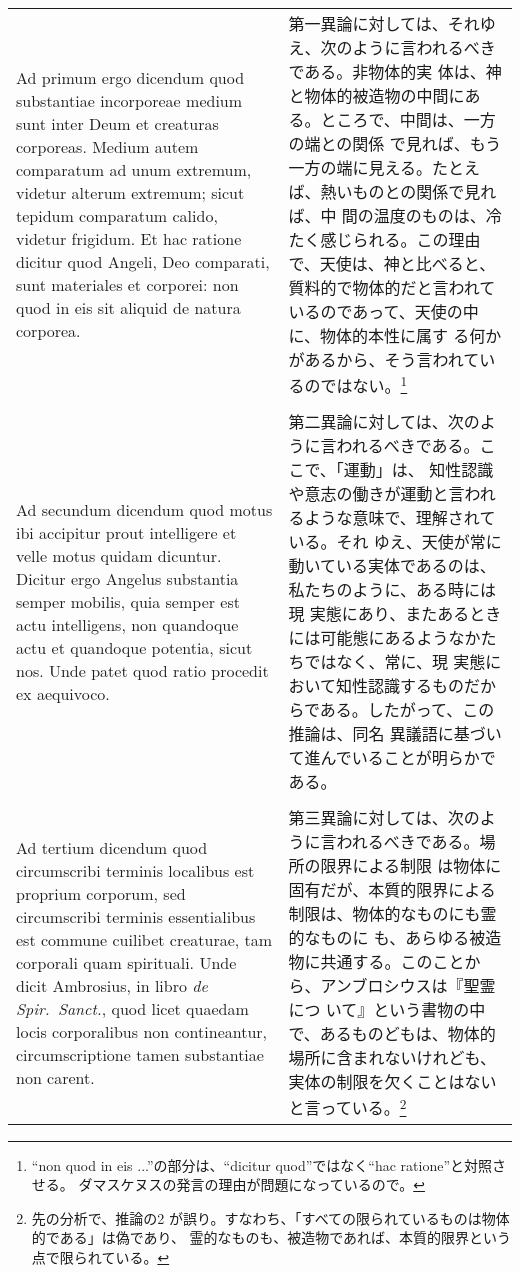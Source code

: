 \documentclass[10pt]{jsarticle} %
\begin{document}
\begin{longtable}{p{21em}p{21em}}
Ad primum ergo dicendum quod substantiae incorporeae medium sunt inter
Deum et creaturas corporeas. Medium autem comparatum ad unum extremum,
videtur alterum extremum; sicut tepidum comparatum calido, videtur
frigidum. Et hac ratione dicitur quod Angeli, Deo comparati, sunt
materiales et corporei: non quod in eis sit aliquid de natura
corporea.

&

第一異論に対しては、それゆえ、次のように言われるべきである。非物体的実
体は、神と物体的被造物の中間にある。ところで、中間は、一方の端との関係
で見れば、もう一方の端に見える。たとえば、熱いものとの関係で見れば、中
間の温度のものは、冷たく感じられる。この理由で、天使は、神と比べると、
質料的で物体的だと言われているのであって、天使の中に、物体的本性に属す
る何かがあるから、そう言われているのではない。\footnote{ ``non quod in
eis ...''の部分は、``dicitur quod''ではなく``hac ratione''と対照させる。
ダマスケヌスの発言の理由が問題になっているので。}
 
\\\\

Ad secundum dicendum quod motus ibi accipitur prout intelligere et
velle motus quidam dicuntur. Dicitur ergo Angelus substantia semper
mobilis, quia semper est actu intelligens, non quandoque actu et
quandoque potentia, sicut nos. Unde patet quod ratio procedit ex
aequivoco.

&

第二異論に対しては、次のように言われるべきである。ここで、「運動」は、
知性認識や意志の働きが運動と言われるような意味で、理解されている。それ
ゆえ、天使が常に動いている実体であるのは、私たちのように、ある時には現
実態にあり、またあるときには可能態にあるようなかたちではなく、常に、現
実態において知性認識するものだからである。したがって、この推論は、同名
異議語に基づいて進んでいることが明らかである。

\\\\

Ad tertium dicendum quod circumscribi terminis localibus est proprium
corporum, sed circumscribi terminis essentialibus est commune cuilibet
creaturae, tam corporali quam spirituali. Unde dicit Ambrosius, in
libro {\itshape de Spir.~Sanct.}, quod licet quaedam locis
corporalibus non contineantur, circumscriptione tamen substantiae non
carent.

&

第三異論に対しては、次のように言われるべきである。場所の限界による制限
は物体に固有だが、本質的限界による制限は、物体的なものにも霊的なものに
も、あらゆる被造物に共通する。このことから、アンブロシウスは『聖霊につ
いて』という書物の中で、あるものどもは、物体的場所に含まれないけれども、
実体の制限を欠くことはないと言っている。\footnote{先の分析で、推論の2
が誤り。すなわち、「すべての限られているものは物体的である」は偽であり、
霊的なものも、被造物であれば、本質的限界という点で限られている。}

\end{longtable}
\newpage
\end{document}
